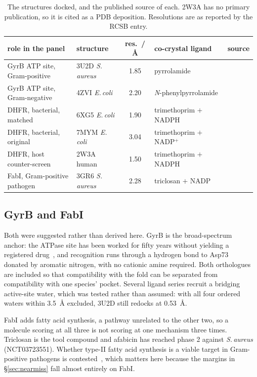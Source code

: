 \documentclass[11pt,a4paper]{article}
\begin{document}
\begin{table}[tb]
\centering
\caption{The structures docked, and the published source of each. 2W3A has no
primary publication, so it is cited as a PDB deposition. Resolutions are as
reported by the RCSB entry.}
\label{tab:structures}
\small
\begin{tabular}{llcll}
\toprule
role in the panel & structure & res.\ / \AA & co-crystal ligand & source \\
\midrule
GyrB ATP site, Gram-positive & 3U2D \textit{S.\,aureus} & 1.85 &
pyrrolamide & \cite{eakin2012} \\
GyrB ATP site, Gram-negative & 4ZVI \textit{E.\,coli} & 2.20 &
\textit{N}-phenylpyrrolamide & \cite{zidar2015} \\
DHFR, bacterial, matched & 6XG5 \textit{E.\,coli} & 1.90 &
trimethoprim $+$ NADPH & \cite{manna2021} \\
DHFR, bacterial, original & 7MYM \textit{E.\,coli} & 3.04 &
trimethoprim $+$ NADP$^+$ & \cite{krucinska2022} \\
DHFR, host counter-screen & 2W3A human & 1.50 &
trimethoprim $+$ NADPH & \cite{pdb2w3a} \\
FabI, Gram-positive pathogen & 3GR6 \textit{S.\,aureus} & 2.28 &
triclosan $+$ NADP & \cite{priyadarshi2010} \\
\bottomrule
\end{tabular}
\end{table}

\subsection{GyrB and FabI}

Both were suggested rather than derived here. GyrB is the broad-spectrum
anchor: the ATPase site has been worked for fifty years without yielding a
registered drug~\cite{bisacchi2015}, and recognition runs through a hydrogen
bond to Asp73 donated by aromatic nitrogen, with no cationic amine required.
Both orthologues are included so that compatibility with the fold can be
separated from compatibility with one species' pocket. Several ligand series
recruit a bridging active-site water, which was tested rather than assumed:
with all four ordered waters within 3.5~\AA{} excluded, 3U2D still redocks at
0.53~\AA.

FabI adds fatty acid synthesis, a pathway unrelated to the other two, so a
molecule scoring at all three is not scoring at one mechanism three times.
Triclosan is the tool compound and afabicin has reached phase 2 against
\textit{S.\,aureus} (NCT03723551). Whether type-II fatty acid synthesis is a
viable target in Gram-positive pathogens is contested~\cite{brinster2009,
parsons2011}, which matters here because the margins in \S\ref{sec:nearmiss}
fall almost entirely on FabI.
\end{document}
